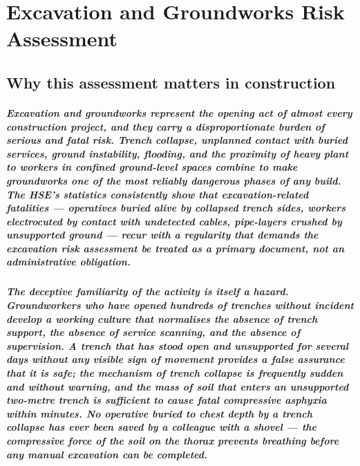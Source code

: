 \chapter{Excavation and Groundworks Risk Assessment}
\label{chap:Excavation and Groundworks Risk Assessment}

\section{Why this assessment matters in construction}

\paragraph{Excavation and groundworks represent the opening act of almost every construction project, and they carry a disproportionate burden of serious and fatal risk. Trench collapse, unplanned contact with buried services, ground instability, flooding, and the proximity of heavy plant to workers in confined ground-level spaces combine to make groundworks one of the most reliably dangerous phases of any build. The HSE's statistics consistently show that excavation-related fatalities --- operatives buried alive by collapsed trench sides, workers electrocuted by contact with undetected cables, pipe-layers crushed by unsupported ground --- recur with a regularity that demands the excavation risk assessment be treated as a primary document, not an administrative obligation.}

\paragraph{The deceptive familiarity of the activity is itself a hazard. Groundworkers who have opened hundreds of trenches without incident develop a working culture that normalises the absence of trench support, the absence of service scanning, and the absence of supervision. A trench that has stood open and unsupported for several days without any visible sign of movement provides a false assurance that it is safe; the mechanism of trench collapse is frequently sudden and without warning, and the mass of soil that enters an unsupported two-metre trench is sufficient to cause fatal compressive asphyxia within minutes. No operative buried to chest depth by a trench collapse has ever been saved by a colleague with a shovel --- the compressive force of the soil on the thorax prevents breathing before any manual excavation can be completed.}

